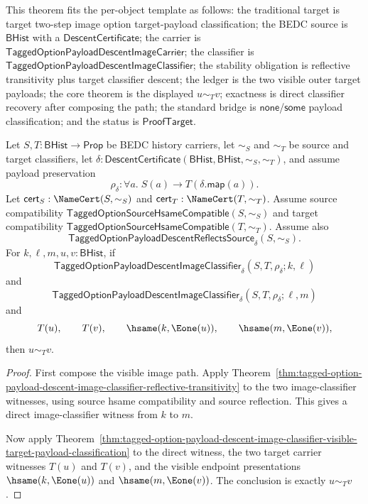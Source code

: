 \begin{theorem}
\label{thm:tagged-option-payload-descent-image-classifier-reflective-transitive-visible-target-payload-classification}
This theorem fits the per-object template as follows: the traditional target is
target two-step image option target-payload classification; the BEDC source is
$\mathsf{BHist}$ with a $\mathsf{DescentCertificate}$; the carrier is
$\mathsf{TaggedOptionPayloadDescentImageCarrier}$; the classifier is
$\mathsf{TaggedOptionPayloadDescentImageClassifier}$; the stability obligation
is reflective transitivity plus target classifier descent; the ledger is the
two visible outer target payloads; the core theorem is the displayed
$u\sim_T v$; exactness is direct classifier recovery after composing the path;
the standard bridge is $\mathsf{none}$/$\mathsf{some}$ payload classification;
and the status is $\mathsf{ProofTarget}$.

Let $S,T:\mathsf{BHist}\to\mathsf{Prop}$ be BEDC history carriers, let
$\sim_S$ and $\sim_T$ be source and target classifiers, let
$\delta:\mathsf{DescentCertificate}(\mathsf{BHist},\mathsf{BHist},\sim_S,\sim_T)$,
and assume payload preservation
$$
\rho_{\delta}:\forall a.\;S(a)\to T(\delta.\mathsf{map}(a)).
$$
Let $\mathsf{cert}_S:\NameCert(S,\sim_S)$ and
$\mathsf{cert}_T:\NameCert(T,\sim_T)$. Assume source compatibility
$\mathsf{TaggedOptionSourceHsameCompatible}(S,\sim_S)$ and target compatibility
$\mathsf{TaggedOptionSourceHsameCompatible}(T,\sim_T)$. Assume also
$$
\mathsf{TaggedOptionPayloadDescentReflectsSource}_{\delta}(S,\sim_S).
$$
For $k,\ell,m,u,v:\mathsf{BHist}$, if
$$
\mathsf{TaggedOptionPayloadDescentImageClassifier}_{\delta}
(S,T,\rho_{\delta};k,\ell)
$$
and
$$
\mathsf{TaggedOptionPayloadDescentImageClassifier}_{\delta}
(S,T,\rho_{\delta};\ell,m)
$$
and
$$
T(u),
\qquad
T(v),
\qquad
\hsame(k,\Eone(u)),
\qquad
\hsame(m,\Eone(v)),
$$
then $u\sim_T v$.
\end{theorem}
\begin{proof}
First compose the visible image path. Apply
Theorem~\ref{thm:tagged-option-payload-descent-image-classifier-reflective-transitivity}
to the two image-classifier witnesses, using source hsame compatibility and
source reflection. This gives a direct image-classifier witness from $k$ to
$m$.

Now apply
Theorem~\ref{thm:tagged-option-payload-descent-image-classifier-visible-target-payload-classification}
to the direct witness, the two target carrier witnesses $T(u)$ and $T(v)$, and
the visible endpoint presentations $\hsame(k,\Eone(u))$ and
$\hsame(m,\Eone(v))$. The conclusion is exactly $u\sim_T v$.
\end{proof}

